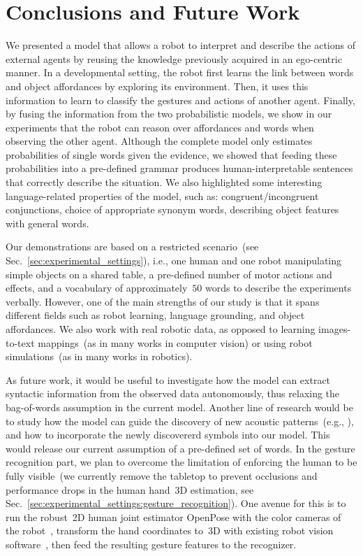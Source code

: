 
\section{Conclusions and Future Work}
\label{sec:conclusions}

We presented a model that allows a robot to interpret and describe the actions of external agents by reusing the knowledge previously acquired in an ego-centric manner.
In a developmental setting, the robot first learns the link between words and object affordances by exploring its environment.
Then, it uses this information to learn to classify the gestures and actions of another agent.
Finally, by fusing the information from the two probabilistic models, we show in our experiments that the robot can reason over affordances and words when observing the other agent.
Although the complete model only estimates probabilities of single words given the evidence, we showed that feeding these probabilities into a pre-defined grammar produces human-interpretable sentences that correctly describe the situation.
We also highlighted some interesting language-related properties of the model, such as:
congruent/incongruent conjunctions,
choice of appropriate synonym words,
describing object features with general words.

Our demonstrations are based on a restricted scenario~(see Sec.~\ref{sec:experimental_settings}), i.e., one human and one robot manipulating simple objects on a shared table, a pre-defined number of motor actions and effects, and a vocabulary of approximately~$50$ words to describe the experiments verbally.
However, one of the main strengths of our study is that it spans different fields such as robot learning, language grounding, and object affordances.
We also work with real robotic data, as opposed to learning images-to-text mappings~(as in many works in computer vision) or using robot simulations~(as in many works in robotics).

As future work, it would be useful to investigate how the model can extract syntactic information from the observed data autonomously, thus relaxing the bag-of-words assumption in the current model.
Another line of research would be to study how the model can guide the discovery of new acoustic patterns~(e.g., \cite{falstrom:2017:glu, vanhainen2014:icassp, vanhainen:2012:interspeech}), and how to incorporate the newly discovererd symbols into our \AffWords{} model.
This would release our current assumption of a pre-defined set of words.
In the gesture recognition part, we plan to overcome the limitation of enforcing the human to be fully visible~(we currently remove the tabletop to prevent occlusions and performance drops in the human hand~3D estimation, see Sec.~\ref{sec:experimental_settings:gesture_recognition}).
One avenue for this is to run the robust~2D human joint estimator OpenPose with the color cameras of the robot~\cite{cao:2017:openpose-cpvr}, transform the hand coordinates to~3D with existing robot vision software~\cite{roncone:2016:rss}, then feed the resulting gesture features to the recognizer.
